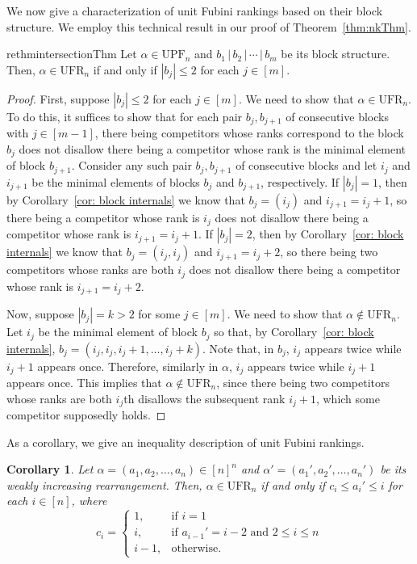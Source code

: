 \documentclass[11pt,reqno]{amsart}
\newtheorem{corollary}{Corollary}[section]
\theoremstyle{definition}
\theoremstyle{notation}
\theoremstyle{openproblem}
\newcommand{\upf}[1]{\text{UPF}_{#1}}
\newcommand{\UFR}[1]{\text{UFR}_{#1}}
\begin{document}
We now give a characterization of unit Fubini rankings based on their block structure.
We employ this technical result in our proof of Theorem~\ref{thm:nkThm}.

\begin{restatable}{rethm}{intersectionThm}
\label{thm: intersection}
Let $\alpha \in \upf{n}$ and $b_1 \,|\, b_2 \,|\, \cdots \,|\, b_m$ be its block structure.
Then, $\alpha \in \UFR{n}$ if and only if $|b_j| \leq 2$ for each $j \in [m]$.
\end{restatable}
\begin{proof}
First, suppose $|b_j| \leq 2$ for each $j \in [m]$.
We need to show that $\alpha \in \UFR{n}$.
To do this, it suffices to show that for each pair $b_j, b_{j+1}$ of consecutive blocks with $j \in [m-1]$, there being competitors whose ranks correspond to the block $b_j$ does not disallow there being a competitor whose rank is the minimal element of block $b_{j+1}$.
Consider any such pair $b_j, b_{j+1}$ of consecutive blocks and let $i_j$ and $i_{j+1}$ be the minimal elements of blocks $b_j$ and $b_{j+1}$, respectively.
If $|b_j| = 1$, then by Corollary~\ref{cor: block internals} we know that $b_j = (i_j)$ and $i_{j+1} = i_j + 1$, so there being a competitor whose rank is $i_j$ does not disallow there being a competitor whose rank is $i_{j+1} = i_j + 1$.
If $|b_j| = 2$, then by Corollary~\ref{cor: block internals} we know that $b_j = (i_j, i_j)$ and $i_{j+1} = i_j + 2$, so there being two competitors whose ranks are both $i_j$ does not disallow there being a competitor whose rank is $i_{j+1} = i_j + 2$.



Now, suppose $|b_j| = k > 2$ for some $j \in [m]$.
We need to show that $\alpha \notin \UFR{n}$.
Let $i_j$ be the minimal element of block $b_j$ so that, by Corollary~\ref{cor: block internals}, $b_j = (i_j, i_j, i_j + 1, \ldots, i_j + k)$.
Note that, in $b_j$, $i_j$ appears twice while $i_j + 1$ appears once.
Therefore, similarly in $\alpha$, $i_j$ appears twice while $i_j + 1$ appears once.
This implies that $\alpha \notin \UFR{n}$, since there being two competitors whose ranks are both $i_j$th disallows the subsequent rank $i_j + 1$, which some competitor supposedly holds.
\end{proof}
As a corollary, we give an inequality description of unit Fubini rankings.
\begin{corollary}
\label{cor: characterization}
Let $\alpha=(a_1,a_2,\ldots,a_n)\in[n]^n$ and $\alpha'=(a_1',a_2',\ldots,a_n')$ be its weakly increasing rearrangement.
Then, $\alpha \in \UFR{n}$ if and only if $c_i\leq a_i'\leq i$ for each $i\in[n]$, where 
\[c_i=\begin{cases}
1,&\mbox{if $i=1$}\\
i,&\mbox{if $a_{i-1}'=i-2$ and $2\leq i\leq n$}\\
i-1,&\mbox{otherwise}.
\end{cases}\]
\end{corollary}
\end{document}

